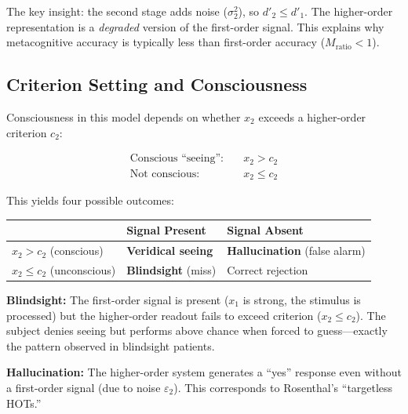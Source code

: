 \documentclass[11pt,a4paper]{report}
\begin{document}
The key insight: the second stage adds noise ($\sigma_2^2$), so $d'_2 \leq d'_1$. The higher-order representation is a \emph{degraded} version of the first-order signal. This explains why metacognitive accuracy is typically less than first-order accuracy ($M_{\text{ratio}} < 1$).

\subsection{Criterion Setting and Consciousness}

Consciousness in this model depends on whether $x_2$ exceeds a higher-order criterion $c_2$:

\begin{mathbox}
\vspace{-6pt}
\begin{align}
  \text{Conscious ``seeing'':}\quad & x_2 > c_2 \label{eq:conscious}\\
  \text{Not conscious:}\quad & x_2 \leq c_2 \label{eq:not_conscious}
\end{align}
\vspace{-8pt}
\end{mathbox}

This yields four possible outcomes:

\begin{center}
\renewcommand{\arraystretch}{1.4}
\begin{tabular}{>{\raggedright}p{2.5cm} >{\centering}p{4cm} >{\centering\arraybackslash}p{4cm}}
  \toprule
  & \textbf{Signal Present} & \textbf{Signal Absent} \\
  \midrule
  $x_2 > c_2$ (conscious) & \textcolor{defcolor}{\textbf{Veridical seeing}} & \textcolor{principlecolor}{\textbf{Hallucination}} (false alarm) \\
  $x_2 \leq c_2$ (unconscious) & \textcolor{predcolor}{\textbf{Blindsight}} (miss) & Correct rejection \\
  \bottomrule
\end{tabular}
\end{center}

\textbf{Blindsight:} The first-order signal is present ($x_1$ is strong, the stimulus is processed) but the higher-order readout fails to exceed criterion ($x_2 \leq c_2$). The subject denies seeing but performs above chance when forced to guess---exactly the pattern observed in blindsight patients.

\textbf{Hallucination:} The higher-order system generates a ``yes'' response even without a first-order signal (due to noise $\varepsilon_2$). This corresponds to Rosenthal's ``targetless HOTs.''
\end{document}
